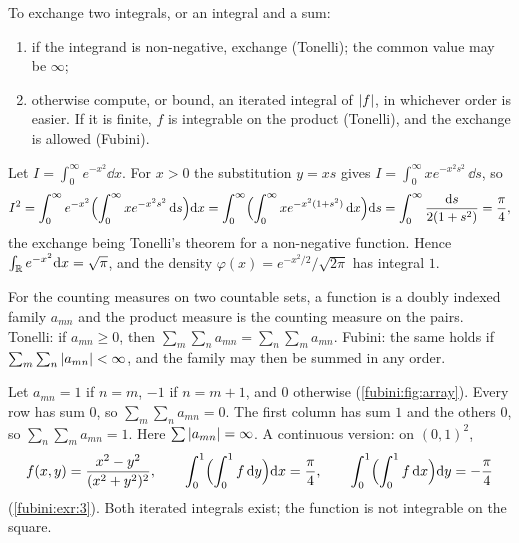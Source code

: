 \begin{notechapter}
\begin{keyidea}
To exchange two integrals, or an integral and a sum:
\begin{enumerate}[nosep]
  \item if the integrand is non-negative, exchange (Tonelli); the
        common value may be $\infty$;
  \item otherwise compute, or bound, an iterated integral of
        $\left|f\right|$, in whichever order is easier. If it is finite, $f$ is
        integrable on the product (Tonelli), and the exchange is
        allowed (Fubini).
\end{enumerate}
\end{keyidea}

\begin{example}\label{fubini:ex:gauss}
Let $I = \int_0^\infty e^{-x^2}\dd x$. For $x > 0$ the substitution
$y = xs$ gives $I = \int_0^\infty xe^{-x^2s^2}\,\dd s$, so
\[
  I^2 = \int_0^\infty e^{-x^2}\Bigl(\int_0^\infty
        xe^{-x^2s^2}\,\mathrm{d} s\Bigr)\mathrm{d} x
  = \int_0^\infty\Bigl(\int_0^\infty xe^{-x^2(1 + s^2)}\,\mathrm{d} x\Bigr)\mathrm{d} s
  = \int_0^\infty\frac{\mathrm{d} s}{2(1 + s^2)} = \frac\pi4 ,
\]
the exchange being Tonelli's theorem for a non-negative function.
Hence $\int_{\mathbb{R}} e^{-x^2}\mathrm{d} x = \sqrt\pi$, and the density
$\varphi(x) = e^{-x^2/2}/\sqrt{2\pi}$ has integral $1$.
\end{example}

\begin{example}\label{fubini:ex:series}
For the counting measures on two countable sets, a function is a doubly
indexed family $a_{mn}$ and the product measure is the counting measure
on the pairs. Tonelli: if $a_{mn}\geq0$, then
$\sum_m\sum_na_{mn} = \sum_n\sum_ma_{mn}$. Fubini: the same holds if
$\sum_m\sum_n\left|a_{mn}\right| < \infty$, and the family may then be summed
in any order.
\end{example}

\begin{pitfall}
Let $a_{mn} = 1$ if $n = m$, $-1$ if $n = m + 1$, and $0$ otherwise
(\cref{fubini:fig:array}). Every row has sum $0$, so
$\sum_m\sum_na_{mn} = 0$. The first column has sum $1$ and the others
$0$, so $\sum_n\sum_ma_{mn} = 1$. Here $\sum\left|a_{mn}\right| = \infty$. A
continuous version: on $(0, 1)^2$,
\[
  f(x, y) = \frac{x^2 - y^2}{(x^2 + y^2)^2} , \qquad
  \int_0^1\Bigl(\int_0^1f\,\mathrm{d} y\Bigr)\mathrm{d} x = \frac\pi4 , \qquad
  \int_0^1\Bigl(\int_0^1f\,\mathrm{d} x\Bigr)\mathrm{d} y = -\frac\pi4
\]
(\cref{fubini:exr:3}). Both iterated integrals exist; the function is
not integrable on the square.
\end{pitfall}


\end{notechapter}
